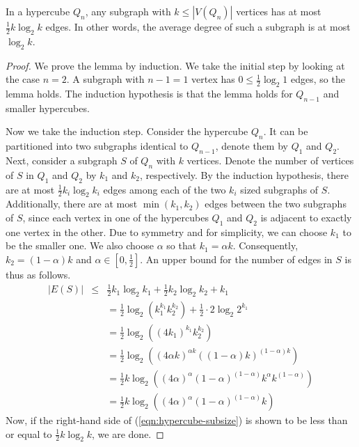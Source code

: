 \documentclass[runningheads, a4paper]{llncs}
\begin{document}
\begin{lemma}\label{lemma:hypercube1}
In a hypercube $Q_n$, any subgraph with $k \leq |V(Q_n)|$ vertices has at most $\frac{1}{2}k \log_2 k$ edges. In other words, the average degree of such a subgraph is at most $\log_2 k$.
\end{lemma}
\begin{proof}
We prove the lemma by induction. We take the initial step by looking at the case $n=2$. A subgraph with $n-1=1$ vertex has $0 \leq \frac{1}{2} \log_2 1$ edges, so the lemma holds. The induction hypothesis is that the lemma holds for $Q_{n-1}$ and smaller hypercubes.

Now we take the induction step. Consider the hypercube $Q_n$. It can be partitioned into two subgraphs identical to $Q_{n-1}$, denote them by $Q_1$ and $Q_2$. Next, consider a subgraph $S$ of $Q_n$ with $k$ vertices. Denote the number of vertices of $S$ in $Q_1$ and $Q_2$ by $k_1$ and $k_2$, respectively. By the induction hypothesis, there are at most $\frac{1}{2}k_i \log_2 k_i$ edges among each of the two $k_i$ sized subgraphs of $S$. Additionally, there are at most $\min(k_1, k_2)$ edges between the two subgraphs of $S$, since each vertex in one of the hypercubes $Q_1$ and $Q_2$ is adjacent to exactly one vertex in the other. Due to symmetry and for simplicity, we can choose $k_1$ to be the smaller one. We also choose $\alpha$ so that $k_1 = \alpha k$. Consequently, $k_2 = (1 - \alpha)k$ and $\alpha \in [0,\frac{1}{2}] $. An upper bound for the number of edges in $S$ is thus as follows.
\begin{eqnarray}\label{eqn:hypercube-subsize}\nonumber
|E(S)| &\leq & \frac{1}{2}k_1 \log_2 k_1 + \frac{1}{2}k_2 \log_2 k_2 + k_1 \\ \nonumber
&& = \frac{1}{2} \log_2 (k_1^{k_1}k_2^{k_2}) + \frac{1}{2} \cdot 2\log_2 2^{k_1} \\ \nonumber
&& = \frac{1}{2} \log_2 \left((4k_1)^{k_1}k_2^{k_2}\right) \\ \nonumber
&& = \frac{1}{2} \log_2 \left((4\alpha k)^{\alpha k}\left((1-\alpha)k\right)^{(1-\alpha)k}\right) \\ \nonumber
&& = \frac{1}{2} k \log_2 \left((4\alpha)^{\alpha}(1-\alpha)^{(1-\alpha)} k^{\alpha}k^{(1-\alpha)}\right) \\ \nonumber
&& = \frac{1}{2} k \log_2 \left((4\alpha)^{\alpha}(1-\alpha)^{(1-\alpha)} k\right)
\end{eqnarray}
Now, if the right-hand side of (\ref{eqn:hypercube-subsize}) is shown to be less than or equal to $\frac{1}{2} k \log_2 k$, we are done.

\end{proof}
\end{document}
